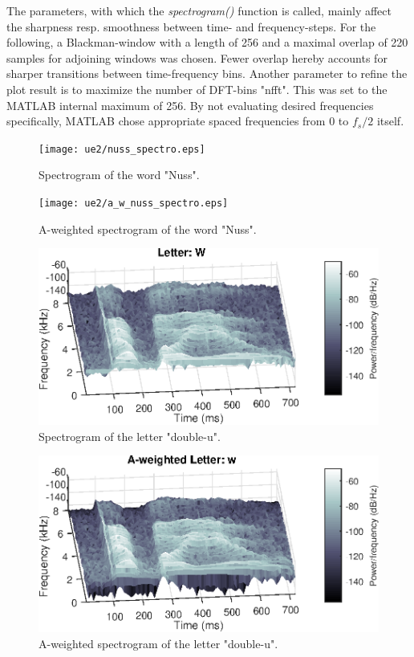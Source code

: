 The parameters, with which the \textit{spectrogram()} function is called, mainly affect the sharpness resp. smoothness between time- and frequency-steps. For the following, a Blackman-window with a length of 256 and a maximal overlap of 220 samples for adjoining windows was chosen. Fewer overlap hereby accounts for sharper transitions between time-frequency bins. Another parameter to refine the plot result is to maximize the number of DFT-bins "nfft". This was set to the MATLAB internal maximum of 256. By not evaluating desired frequencies specifically, MATLAB chose appropriate spaced frequencies from 0 to $f_s/2$ itself.

\clearpage

\begin{figure}[t] 
  \centering
  \texttt{[image: ue2/nuss\_spectro.eps]} %
  \caption{Spectrogram of the word "Nuss".}
  \label{fig:nuss_spectro}
\end{figure}
\begin{figure}[b] 
  \centering
  \texttt{[image: ue2/a\_w\_nuss\_spectro.eps]} %
  \caption{A-weighted spectrogram of the word "Nuss".}
  \label{fig:a_nuss_spectro}
\end{figure}

\clearpage
\begin{figure}[t] 
  \centering
  \includegraphics[width=\linewidth]{ue2/w_spectro.eps} %
  \caption{Spectrogram of the letter "double-u".}
  \label{fig:w_spectro}
\end{figure}

\begin{figure}[b] 
  \centering
  \includegraphics[width=\linewidth]{ue2/a_w_w_spectro.eps} %
  \caption{A-weighted spectrogram of the letter "double-u".}
  \label{fig:a_w_spectro}
\end{figure}
